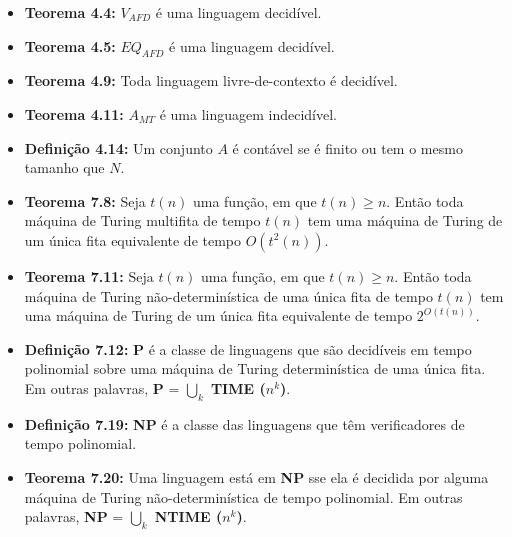 \documentclass[12pt,a4paper,oneside]{article}
\begin{document}
\begin{itemize}
	\item[] {\bf Teorema 4.4:} $V_{AFD}$ é uma linguagem decidível.
	\item[] {\bf Teorema 4.5:} $EQ_{AFD}$ é uma linguagem decidível.
	\item[] {\bf Teorema 4.9:} Toda linguagem livre-de-contexto é decidível.
	\item[] {\bf Teorema 4.11:} $A_{MT}$ é uma linguagem indecidível.
	\item[] {\bf Definição 4.14:} Um conjunto $A$ é contável se é finito ou tem o mesmo tamanho que $N$.
	\item[] {\bf Teorema 7.8: }
	Seja $t(n)$ uma função, em que $t(n) \geq n$. Então toda máquina de Turing multifita de tempo $t(n)$ tem uma máquina de Turing de um única fita equivalente de tempo $O(t^2(n))$.
	\item[] {\bf Teorema 7.11: }
	Seja $t(n)$ uma função, em que $t(n) \geq n$. Então toda máquina de Turing não-determinística de uma única fita de tempo $t(n)$ tem uma máquina de Turing de um única fita equivalente de tempo $2^{O(t(n))}$.	
	\item[] {\bf Definição 7.12: }
	{\bf P} é a classe de linguagens que são decidíveis em tempo polinomial sobre uma máquina de Turing determinística de uma única fita. Em outras palavras, {\bf P} = $\bigcup\limits_{k}$ {\bf TIME ($n^k$)}.
	\item[] {\bf Definição 7.19: }
	{\bf NP} é a classe das linguagens que têm verificadores de tempo polinomial.
	\item[] {\bf Teorema 7.20: }
	Uma linguagem está em {\bf NP} sse ela é decidida por alguma máquina de Turing não-determinística de tempo polinomial.  Em outras palavras, {\bf NP} = $\bigcup\limits_{k}$ {\bf NTIME ($n^k$)}.
\end{itemize}
\end{document}
